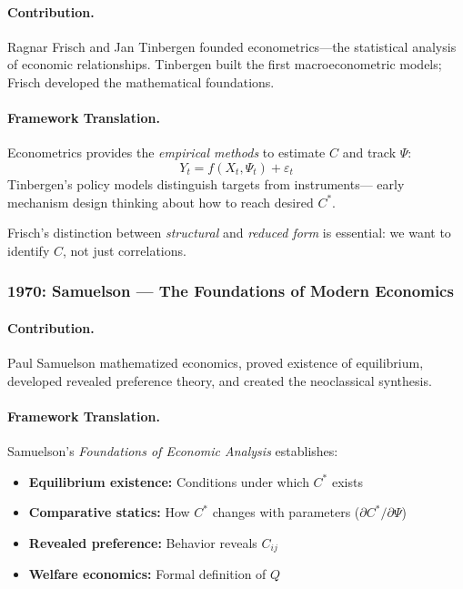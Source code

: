 \documentclass[12pt,a4paper]{article}
\begin{document}
\paragraph{Contribution.}
Ragnar Frisch and Jan Tinbergen founded econometrics---the statistical
analysis of economic relationships. Tinbergen built the first macroeconometric
models; Frisch developed the mathematical foundations.

\paragraph{Framework Translation.}
Econometrics provides the \emph{empirical methods} to estimate $C$ and track $\Psi$:
\begin{equation}
  Y_t = f(X_t, \Psi_t) + \varepsilon_t
\end{equation}
Tinbergen's policy models distinguish targets from instruments---
early mechanism design thinking about how to reach desired $C^*$.

Frisch's distinction between \emph{structural} and \emph{reduced form}
is essential: we want to identify $C$, not just correlations.

\subsubsection{1970: Samuelson --- The Foundations of Modern Economics}

\paragraph{Contribution.}
Paul Samuelson \citep{samuelson1947} mathematized economics, proved existence of equilibrium,
developed revealed preference theory, and created the neoclassical synthesis.

\paragraph{Framework Translation.}
Samuelson's \emph{Foundations of Economic Analysis} establishes:
\begin{itemize}
  \item \textbf{Equilibrium existence:} Conditions under which $C^*$ exists
  \item \textbf{Comparative statics:} How $C^*$ changes with parameters ($\partial C^*/\partial \Psi$)
  \item \textbf{Revealed preference:} Behavior reveals $C_{ij}$
  \item \textbf{Welfare economics:} Formal definition of $Q$
\end{itemize}
\end{document}

